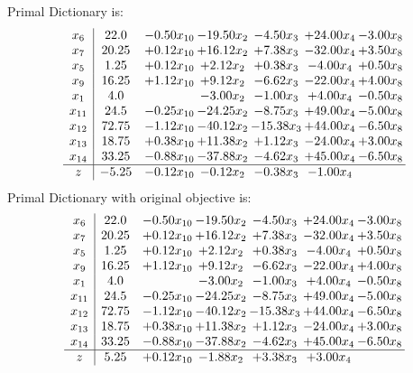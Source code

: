 \documentclass[9pt]{article}
\begin{document}
Primal Dictionary is:
\[\begin{array}{c| c c@{\hskip 2pt} c@{\hskip 2pt} c@{\hskip 2pt} c@{\hskip 2pt} c@{\hskip 2pt} }
 x_{6}   &  22.0 & -0.50 x_{10} & -19.50 x_{2} & -4.50 x_{3} & + 24.00 x_{4} & -3.00 x_{8}\\
 x_{7}   &  20.25 & +  0.12 x_{10} & + 16.12 x_{2} & +  7.38 x_{3} & -32.00 x_{4} & +  3.50 x_{8}\\
 x_{5}   &  1.25 & +  0.12 x_{10} & +  2.12 x_{2} & +  0.38 x_{3} & -4.00 x_{4} & +  0.50 x_{8}\\
 x_{9}   &  16.25 & +  1.12 x_{10} & +  9.12 x_{2} & -6.62 x_{3} & -22.00 x_{4} & +  4.00 x_{8}\\
 x_{1}   &  4.0  &   & -3.00 x_{2} & -1.00 x_{3} & +  4.00 x_{4} & -0.50 x_{8}\\
 x_{11}   &  24.5 & -0.25 x_{10} & -24.25 x_{2} & -8.75 x_{3} & + 49.00 x_{4} & -5.00 x_{8}\\
 x_{12}   &  72.75 & -1.12 x_{10} & -40.12 x_{2} & -15.38 x_{3} & + 44.00 x_{4} & -6.50 x_{8}\\
 x_{13}   &  18.75 & +  0.38 x_{10} & + 11.38 x_{2} & +  1.12 x_{3} & -24.00 x_{4} & +  3.00 x_{8}\\
 x_{14}   &  33.25 & -0.88 x_{10} & -37.88 x_{2} & -4.62 x_{3} & + 45.00 x_{4} & -6.50 x_{8}\\
\hline
z    &  -5.25 & -0.12 x_{10} & -0.12 x_{2} & -0.38 x_{3} & -1.00 x_{4} &   \\
\end{array}\]
Primal Dictionary with original objective is:
\[\begin{array}{c| c c@{\hskip 2pt} c@{\hskip 2pt} c@{\hskip 2pt} c@{\hskip 2pt} c@{\hskip 2pt} }
 x_{6}   &  22.0 & -0.50 x_{10} & -19.50 x_{2} & -4.50 x_{3} & + 24.00 x_{4} & -3.00 x_{8}\\
 x_{7}   &  20.25 & +  0.12 x_{10} & + 16.12 x_{2} & +  7.38 x_{3} & -32.00 x_{4} & +  3.50 x_{8}\\
 x_{5}   &  1.25 & +  0.12 x_{10} & +  2.12 x_{2} & +  0.38 x_{3} & -4.00 x_{4} & +  0.50 x_{8}\\
 x_{9}   &  16.25 & +  1.12 x_{10} & +  9.12 x_{2} & -6.62 x_{3} & -22.00 x_{4} & +  4.00 x_{8}\\
 x_{1}   &  4.0  &   & -3.00 x_{2} & -1.00 x_{3} & +  4.00 x_{4} & -0.50 x_{8}\\
 x_{11}   &  24.5 & -0.25 x_{10} & -24.25 x_{2} & -8.75 x_{3} & + 49.00 x_{4} & -5.00 x_{8}\\
 x_{12}   &  72.75 & -1.12 x_{10} & -40.12 x_{2} & -15.38 x_{3} & + 44.00 x_{4} & -6.50 x_{8}\\
 x_{13}   &  18.75 & +  0.38 x_{10} & + 11.38 x_{2} & +  1.12 x_{3} & -24.00 x_{4} & +  3.00 x_{8}\\
 x_{14}   &  33.25 & -0.88 x_{10} & -37.88 x_{2} & -4.62 x_{3} & + 45.00 x_{4} & -6.50 x_{8}\\
\hline
z    &  5.25 & +  0.12 x_{10} & -1.88 x_{2} & +  3.38 x_{3} & +  3.00 x_{4} &   \\
\end{array}\]
\end{document}
